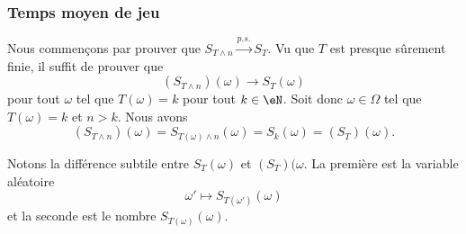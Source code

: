 \subsubsection{Temps moyen de jeu}

Nous commençons par prouver que \( S_{T\wedge n}\stackrel{p.s.}{\longrightarrow}S_T\). Vu que \( T \) est presque sûrement finie, il suffit de prouver que
\begin{equation}
    (S_{T\wedge n})(\omega)\to S_T(\omega)
\end{equation}
pour tout \( \omega\) tel que \( T(\omega)=k\) pour tout \( k\in \eN\). Soit donc \( \omega\in \Omega\) tel que \( T(\omega)=k\) et \( n>k\). Nous avons
\begin{equation}
    (S_{T\wedge n})(\omega)=S_{T(\omega)\wedge n}(\omega)=S_k(\omega)=(S_T)(\omega).
\end{equation}

\begin{remark}
    Notons la différence subtile entre \( S_T(\omega)\) et \( (S_T)(\omega\). La première est la variable aléatoire
    \begin{equation}
        \omega'\mapsto S_{T(\omega')}(\omega)
    \end{equation}
    et la seconde est le nombre \( S_{T(\omega)}(\omega)\).
\end{remark}

